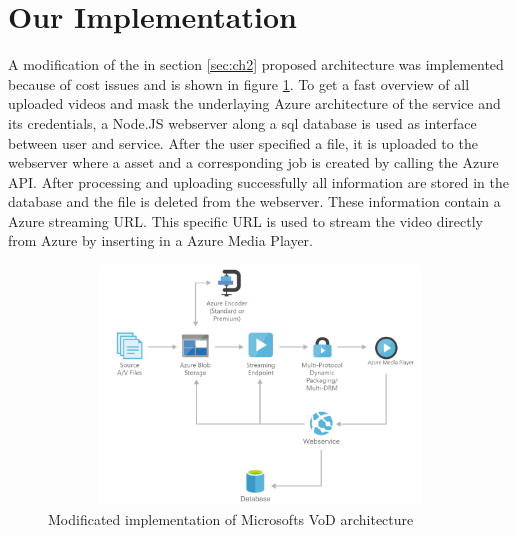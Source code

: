 \section{Our Implementation}\label{sec:ch3}
A modification of the in section \ref{sec:ch2} proposed architecture was implemented because of cost issues and is shown in figure \ref{fig:arch_new}. To get a fast overview of all uploaded videos and mask the underlaying Azure architecture of the service and its credentials, a Node.JS webserver along a sql database is used as interface between user and service. After the user specified a file, it is uploaded to the webserver where a asset and a corresponding job is created by calling the Azure API. After processing and uploading successfully all information are stored in the database and the file is deleted from the webserver. These information contain a Azure streaming URL. This specific URL is used to stream the video directly from Azure by inserting in a Azure Media Player.
\begin{figure}[ht]
    \centering
    \includegraphics[width=1\textwidth, height=240px]{ressources/architecture_new.png}
    \caption{Modificated implementation of Microsofts VoD architecture}
    \label{fig:arch_new}
  \end{figure}

